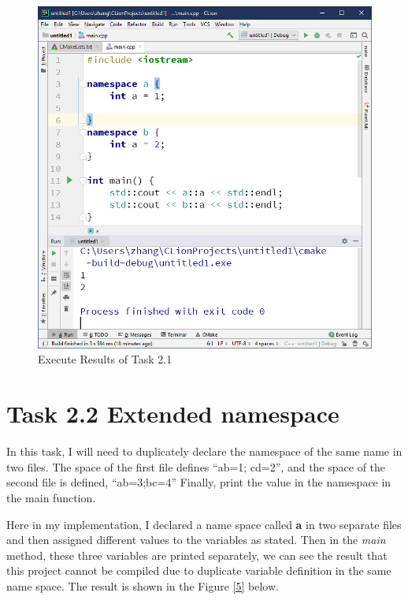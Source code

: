 \documentclass[a4paper]{report}
\begin{document}
\begin{figure}
  \centering
  \includegraphics[scale=0.5]{TwoOne.PNG}
  \caption{Execute Results of Task 2.1}\label{4}
\end{figure}

\section{Task 2.2 Extended namespace}
In this task, I will need to duplicately declare the namespace of the same name in two files. The space of the first file defines ``ab=1; cd=2'', and the space of the second file is defined, ``ab=3;bc=4'' Finally, print the value in the namespace in the main function.
\par
Here in my implementation, I declared a name space called \textbf{a} in two separate files and then assigned different values to the variables as stated. Then in the \emph{main} method, these three variables are printed separately, we can see the result that this project cannot be compiled due to duplicate variable definition in the same name space. The result is shown in the Figure \ref{5} below.
\end{document}
